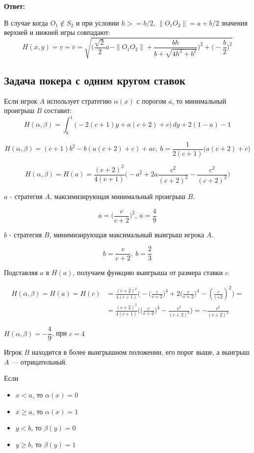 \documentclass[12pt,a4paper]{article}
\begin{document}
\vspace{.5cm}
\textbf{Ответ:}

В случае когда $O_1 \notin S_2$ и при условии $h >= b/2$, $\| O_1 O_2 \| = a + b/2$
значения верхней и нижней игры совпадают:
\[
  H(x, y) = \underline{v} = \overline{v} = \sqrt{
    \bigl(\frac{\sqrt{2}}{2}a - \|O_1 O_2\|+\frac{bh}{b+\sqrt{4h^2+b^2}}\bigr)^2 +
    \bigl(-\frac{b}{2}\bigr)^2
  }
\]
\pagebreak

\subsection{Задача покера с одним кругом ставок}
Если игрок $A$ использует стратегию $\alpha(x)$ с порогом  $a$, то минимальный
проигрыш $B$ составит:
\[
  H(\alpha,\beta) = \int_{b}^{1} \biggl(-2(c+1)y + a(c+2)+c\biggr) \,dy + 2(1-a)-1
\]

\[
  H(\alpha,\beta) = (c+1)b^2-b(a(c+2)+c)+ac,\:b = \frac{1}{2(c+1)}\bigl(a(c+2)+c\bigr)
\]

\[
  H(\alpha,\beta) = H(a) = \frac{(c+2)^2}{4(c+1)}\bigl(-a^2+2a\frac{c^2}{(c+2)^2} - \frac{c^2}{(c+2)^2}\bigr)
\]

$a$ - стратегия $A$, максимизирующая минимальный проигрыш $B$.

\[
  a = \bigl(\frac{c}{c+2}\bigr)^2, \: a = \frac{4}{9}
\]

$b$ - стратегия $B$, минимизирующая максимальный выигрыш игрока $A$.

\[
  b = \frac{c}{c+2}, \: b = \frac{2}{3}
\]

Подставляя $a$ в $H(a)$, получаем функцию выигрыша от размера ставки $c$.

\[
  \begin{aligned}
    H(\alpha,\beta) = H(a) = H(c) & = \frac{(c+2)^2}{4(c+1)}\bigl(-\bigl(\frac{c}{c+2}\bigr)^4+2\bigl(\frac{c}{c+2}\bigr)^4 - (\frac{c}{(+2})^2\bigr) =\\
    & = \frac{(c+2)^2}{4(c+1)}\bigl(\bigl(\frac{c}{c+2}\bigr)^4 - \frac{c^2}{(c+2)^2}\bigr) = -\frac{c^2}{(c+2)^2}
  \end{aligned}
\]

\begin{center}
  $H(\alpha, \beta) = -\dfrac{4}{9}$, при $c=4$
\end{center}

Игрок $B$ находится в более выигрышном положении, его порог выше, а выигрыш $A$ --- отрицательный.

\vspace{.5cm}
Если
\begin{itemize}
  \item[] $x <   a$, то $\alpha(x) = 0$
  \item[] $x \ge a$, то $\alpha(x) = 1$
  \item[] $y <   b$, то $\beta(y) = 0$
  \item[] $y \ge b$, то $\beta(y) = 1$
\end{itemize}
\end{document}
